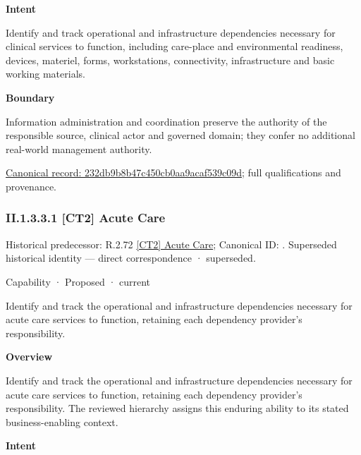\textbf{Intent}



Identify and track operational and infrastructure dependencies necessary for clinical services to function, including care-place and environmental readiness, devices, materiel, forms, workstations, connectivity, infrastructure and basic working materials.



\textbf{Boundary}



Information administration and coordination preserve the authority of the responsible source, clinical actor and governed domain; they confer no additional real-world management authority.


{\footnotesize \href{../../../../../../../continuum/strategy/capability/232db9b8b47c450cb0aa9acaf539c09d.md}{Canonical record: 232db9b8b47c450cb0aa9acaf539c09d}; full qualifications and provenance.}\par
\subsubsection*{II.1.3.3.1 [CT2] Acute Care}
\label{navigation:II.1.3.3.1}

{\small Historical predecessor: R.2.72 \hyperref[element:7b591957f7424424abc80f699e9f1960]{[CT2] Acute Care}; Canonical ID: \texttt{}. Superseded historical identity — direct correspondence · superseded.}\par
\label{element:9bb988c526404522b83aeed5069e0eb5}
{\small Capability · Proposed · current}\par

Identify and track the operational and infrastructure dependencies necessary for acute care services to function, retaining each dependency provider's responsibility.



\textbf{Overview}



Identify and track the operational and infrastructure dependencies necessary for acute care services to function, retaining each dependency provider's responsibility. The reviewed hierarchy assigns this enduring ability to its stated business-enabling context.



\textbf{Intent}




